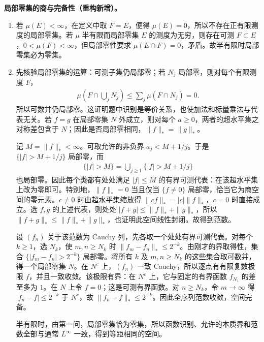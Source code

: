 \documentclass[../../main.tex]{subfiles}
\begin{document}
\begin{solution}
\textbf{局部零集的商与完备性（重构新增）。}
\begin{enumerate}
\item 若 $\mu(E)<\infty$，在定义中取 $F=E$，便得 $\mu(E)=0$，所以不存在正有限测度的局部零集。若 $\mu$ 半有限而局部零集 $E$ 的测度为无穷，则存在可测 $F\subset E$，$0<\mu(F)<\infty$，但局部零性要求 $\mu(E\cap F)=0$，矛盾。故半有限时局部零集必为零集。
\item 先核验局部零集的运算：可测子集仍局部零；若 $N_j$ 局部零，则对每个有限测度 $F$，
\begin{align*}
\mu\left(F\cap\bigcup_jN_j\right)\leqslant\sum_j\mu(F\cap N_j)=0.
\end{align*}
所以可数并仍局部零。这证明题中识别是等价关系，也使加法和标量乘法与代表无关。若 $f=g$ 在局部零集 $N$ 外成立，则对每个 $a\geqslant0$，两者的超水平集之对称差包含于 $N$；因此是否局部零相同，$\|f\|_* =\|g\|_*$。

记 $M=\|f\|_*<\infty$。可取允许的非负界 $a_j<M+1/j$。于是 $\{|f|>M+1/j\}$ 局部零，而
\begin{align*}
\{|f|>M\}=\bigcup_{j\geqslant1}\{|f|>M+1/j\}
\end{align*}
也局部零。因此每个类都有处处满足 $|f|\leqslant M$ 的有界可测代表：在该超水平集上改为零即可。特别地，$\|f\|_*=0$ 当且仅当 $\{f\ne0\}$ 局部零，恰当它为商空间的零元素。$c\ne0$ 时由超水平集缩放得 $\|cf\|_*=|c|\|f\|_*$，$c=0$ 时直接成立。选 $f,g$ 的上述代表，则处处 $|f+g|\leqslant\|f\|_*+\|g\|_*$，所以 $\|f+g\|_*\leqslant\|f\|_*+\|g\|_*$，也证明此空间线性封闭。故得到范数。

设 $(f_n)$ 关于该范数为 Cauchy 列，先各取一个处处有界可测代表。对每个 $k\geqslant1$，选 $N_k$，使 $m,n\geqslant N_k$ 时 $\|f_m-f_n\|_*\leqslant2^{-k}$。由刚才的界取得性，集合 $\{|f_m-f_n|>2^{-k}\}$ 局部零。将所有 $k$ 及 $m,n\geqslant N_k$ 的这些集合取可数并，得一个局部零集 $N$。在 $N^c$ 上，$(f_n)$ 一致 Cauchy，所以逐点有有限复数极限 $f$，并且一致收敛。该极限有界：在 $N^c$ 上，它与固定的有界函数 $f_{N_1}$ 的差至多为 $1$。在 $N$ 上令 $f=0$；这是可测有界函数。对 $n\geqslant N_k$，令 $m\to\infty$ 得 $|f_n-f|\leqslant2^{-k}$ 于 $N^c$，故 $\|f_n-f\|_*\leqslant2^{-k}$。因此全序列范数收敛，空间完备。

半有限时，由第一问，局部零集恰为零集，所以函数识别、允许的本质界和范数全部与通常 $L^\infty$ 一致，得到等距相同的空间。
\end{enumerate}
\end{solution}
\end{document}

